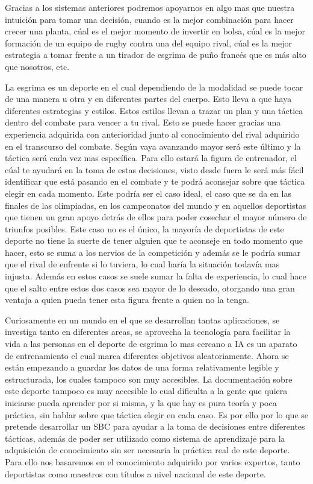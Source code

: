 \documentclass[11pt,a4paper,twoside,final]{article}
\begin{document}
\smallskip
Gracias a los sistemas anteriores podremos apoyarnos en algo mas que nuestra intuición para tomar una decisión, cuando es la mejor combinación para hacer crecer una planta,
 cúal es el mejor momento de invertir en bolsa, cúal es la mejor formación de un equipo de rugby contra una del equipo rival, cúal es la mejor estrategia a tomar frente a un tirador de esgrima
 de puño francés que es más alto que nosotros, etc.

\bigskip
La esgrima es un deporte en el cual dependiendo de la modalidad se puede tocar de una manera u otra y en diferentes partes del cuerpo. Esto lleva a que haya diferentes estrategias
 y estilos. Estos estilos llevan a trazar un plan y una táctica dentro del combate para vencer a tu rival. Esto se puede hacer gracias una experiencia adquirida con anterioridad
 junto al conocimiento del rival adquirido en el transcurso del combate. Según vaya avanzando mayor será este último y la táctica será cada vez mas específica. Para ello
 estará la figura de entrenador, el cúal te ayudará en la toma de estas decisiones, visto desde fuera le será más fácil identificar que está pasando en el combate y te podrá
 aconsejar sobre que táctica elegir en cada momento. Este podría ser el caso ideal, el caso que se da en las finales de las olimpiadas, en los campeonatos del mundo y en aquellos
 deportistas que tienen un gran apoyo detrás de ellos para poder cosechar el mayor número de triunfos posibles. Este caso no es el único, la mayoría de deportistas de este deporte
 no tiene la suerte de tener alguien que te aconseje en todo momento que hacer, esto se suma a los nervios de la competición y además se le podría sumar que el rival de enfrente
 si lo tuviera, lo cual haría la situación todavía mas injusta. Además en estos casos se suele sumar la falta de experiencia, lo cual hace que el salto entre estos dos casos sea
 mayor de lo deseado, otorgando una gran ventaja a quien pueda tener esta figura frente a quien no la tenga.

\bigskip
Curiosamente en un mundo en el que se desarrollan tantas aplicaciones, se investiga tanto en diferentes areas, se aprovecha la tecnología para facilitar la vida a las personas
 en el deporte de esgrima lo mas cercano a IA es un aparato de entrenamiento el cual marca diferentes objetivos aleatoriamente. Ahora se están empezando a guardar los datos de
 una forma relativamente legible y estructurada, los cuales tampoco son muy accesibles. La documentación sobre este deporte tampoco es muy accesible lo cual dificulta a la gente
 que quiera iniciarse pueda aprender por si misma, y la que hay es pura teoría y poca práctica, sin hablar sobre que táctica elegir en cada caso. Es por ello por lo que se pretende
 desarrollar un SBC para ayudar a la toma de decisiones entre diferentes tácticas, además de poder ser utilizado como sistema de aprendizaje para la adquisición de conocimiento
 sin ser necesaria la práctica real de este deporte. Para ello nos basaremos en el conocimiento adquirido por varios expertos, tanto deportistas como maestros con títulos a nivel
 nacional de este deporte.
\end{document}
